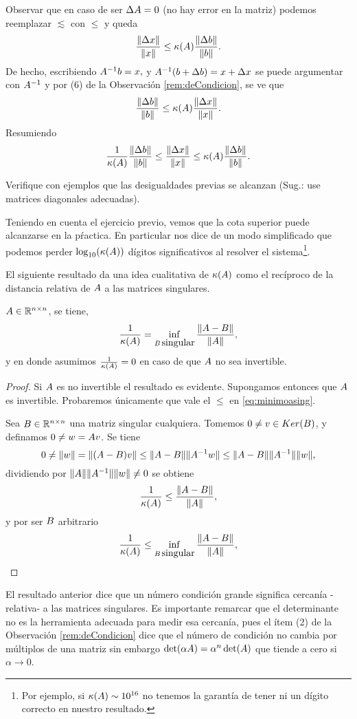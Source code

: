 Observar que en caso de ser $\Delta \Ab=\cero$ (no hay error en la matriz) podemos reemplazar $\lesssim$ con $\le$ y queda
$$\frac{\|\Delta \xb\|}{\|\xb\|}\le \kappa(\Ab)\frac{\|\Delta \bb\|}{\|\bb\|}.$$
De hecho, escribiendo
$\Ab^{-1}\bb=\xb,$ y $\Ab^{-1}(\bb+\Delta\bb)=\xb+\Delta \xb$ se puede argumentar con $\Ab^{-1}$ y por (6) de la Observación \ref{rem:deCondicion}, se ve que
$$\frac{\|\Delta \bb\|}{\|\bb\|}\le \kappa(\Ab)\frac{\|\Delta \xb\|}{\|\xb\|}.$$
Resumiendo
\tcc
$$\frac{1}{\kappa(\Ab)}\frac{\|\Delta \bb\|}{\|\bb\|}\le \frac{\|\Delta \xb\|}{\|\xb\|}\le \kappa(\Ab)\frac{\|\Delta \bb\|}{\|\bb\|}.$$
\etcc
\begin{ejercicio}
 Verifique con ejemplos que las desigualdades previas se alcanzan (Sug.: use matrices diagonales adecuadas).
\end{ejercicio}
Teniendo en cuenta el ejercicio previo, vemos que la cota superior puede alcanzarse en la pŕactica. En particular nos dice de un modo simplificado que podemos perder $\log_{10}(\kappa(\Ab))$ dígitos significativos al resolver el sistema\footnote{Por ejemplo, si $\kappa(\Ab)\sim 10^{16}$ no tenemos la garantía de tener ni un dígito correcto en nuestro resultado.}.

El siguiente resultado da una idea cualitativa de $\kappa(\Ab)$ como el recíproco de la distancia relativa de $\Ab$ a las matrices singulares.
\begin{teorema}
 $\Ab\in \Rnn$, se tiene,
 \begin{equation}
 \label{eq:minimoasing}
\frac{1}{\kappa(\Ab)}=\inf_{\Bb\,  \mbox{singular}} \frac{\|\Ab-\Bb\|}{\|\Ab\|},
 \end{equation}
 y en donde asumimos $\frac{1}{\kappa(\Ab)}=0$ en caso de que $\Ab$ no sea invertible.
 \end{teorema}
 \begin{proof}
  Si $\Ab$ es no invertible el resultado es evidente. Supongamos entonces que $\Ab$ es invertible. Probaremos únicamente que vale  el $\le$  en \eqref{eq:minimoasing}.

  Sea $B\in \mathbb R^{n\times n}$ una matriz singular cualquiera. Tomemos $\cero\neq \vb\in Ker(\Bb)$, y definamos $\cero\neq\wb=\Ab\vb$. Se tiene
  $$
  0\neq \|\wb\|=\|(\Ab - \Bb)\vb\|\le \|\Ab-\Bb\|\|\Ab^{-1}\wb\|\le \|\Ab-\Bb\|\|\Ab^{-1}\|\|\wb\|,
  $$
  dividiendo por $\|\Ab\|\|\Ab^{-1}\|\|\wb\|\neq 0$ se obtiene
  $$
\frac{1}{\kappa(\Ab)}\le  \frac{\|\Ab-\Bb\|}{\|\Ab\|},
 $$
 y por ser $\Bb$ arbitrario
 $$
\frac{1}{\kappa(\Ab)}\le \inf_{\Bb\,  \mbox{singular}} \frac{\|\Ab-\Bb\|}{\|\Ab\|},
 $$
 \end{proof}
El resultado anterior dice que un número condición grande significa cercanía -relativa- a las matrices singulares. Es importante remarcar que el determinante  no es la herramienta adecuada para medir esa cercanía, pues el ítem (2) de la Observación \ref{rem:deCondicion} dice que el número de condición no cambia por múltiplos de una matriz sin embargo $\det(\alpha\Ab)=\alpha^n\det(\Ab)$ que tiende a cero si $\alpha\to 0$.

